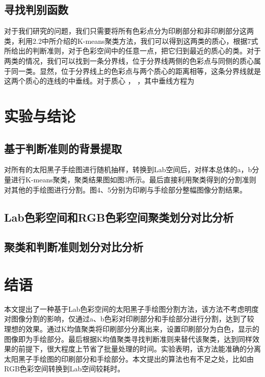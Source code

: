 \documentclass[UTF8,a4paper,twoside]{ctexart}
\begin{document}
\subsection{寻找判别函数}
对于我们研究的问题，我们只需要将所有色彩点分为印刷部分和非印刷部分这两类，利用2.2中所介绍的K-means聚类方法，我们可以得到这两类的质心，根据7式所给出的判断准则，对于色彩空间中的任意一点，把它归到最近的质心的类。对于两类的情况，我们可以找到一条分界线，位于分界线两侧的色彩点与同侧的质心属于同一类。显然，位于分界线上的色彩点与两个质心的距离相等，这条分界线就是这两个质心的连线的中垂线。对于质心 ， ，其中垂线方程为 

\section{实验与结论}
\subsection{基于判断准则的背景提取}
对所有的太阳黑子手绘图进行随机抽样，转换到Lab空间后，对样本总体的a，b分量进行K-means聚类，聚类结果图如图3所示。最后直接利用聚类得到的分割准则对其他的手绘图进行分割。图4、5分别为印刷与手绘部分整幅图像分割结果。

\subsection{Lab色彩空间和RGB色彩空间聚类划分对比分析}

\subsection{聚类和判断准则划分对比分析}

\section{结语}

本文提出了一种基于Lab色彩空间的太阳黑子手绘图分割方法，该方法不考虑明度对图像分割的影响，仅通过a、b色彩对印刷部分和手绘部分进行分割，达到了较理想的效果。通过K均值聚类将印刷部分分离出来，设置印刷部分为白色，显示的图像即为手绘部分。最后根据K均值聚类寻找判断准则来替代该聚类，达到同样效果的前提下，很大程度上节省了批量处理的时间。实验表明，该方法能准确的分离太阳黑子手绘图的印刷部分和手绘部分。本文提出的算法也有不足之处，比如由RGB色彩空间转换到Lab空间较耗时。





\end{document}
